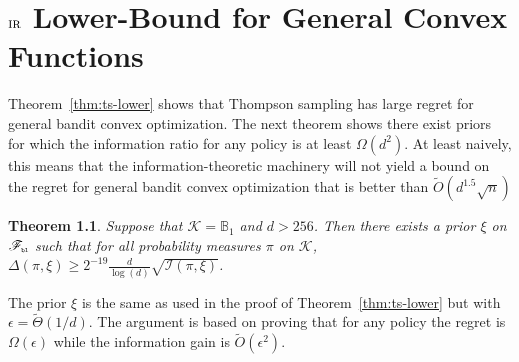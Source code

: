 \documentclass[letter, 12pt]{report}
\newcommand{\todoa}[2][]{\todo[size=\scriptsize,color=green!20!white,#1]{Alr: #2}}
\newcommand{\pb}{\text{\tiny\texttt{b}}}
\newcommand{\pl}{\text{\tiny\texttt{l}}}
\newcommand{\ball}{\mathbb{B}}
\newcommand{\cK}{\mathcal K}
\newcommand{\sF}{\mathscr F}
\newcommand{\I}{\mathcal{I}}
\newcommand{\1}{\mathbf{1}}
\newcommand{\IR}{\operatorname{\textsc{ir}}}
\theoremstyle{plain}
\newtheorem{theorem}{Theorem}
\theoremstyle{definition}
\theoremstyle{remark}
\begin{document}
\chapter{$\IR$ Lower-‌‌Bound for General Convex Functions}
Theorem~\ref{thm:ts-lower} shows that Thompson sampling has large regret for general bandit convex optimization.
The next theorem shows there exist priors for which the information ratio for any policy is at least $\Omega(d^2)$.
At least naively, this means that the information-theoretic machinery will not yield a bound on the regret for general bandit convex optimization that
is better than $\tilde O(d^{1.5} \sqrt{n})$

\begin{theorem}\label{thm:inf-lower}
    Suppose that $\cK = \ball_1$ and $d>256$. Then there exists a prior $\xi$ on $\sF_{\pb\pl}$ such that for all probability measures $\pi$ on $\cK$,
    $\Delta(\pi, \xi) \geq 2^{-19} \frac{d}{\log(d)} \sqrt{\I(\pi, \xi)}$. %
\end{theorem}

The prior $\xi$ is the same as used in the proof of Theorem~\ref{thm:ts-lower} but with $\epsilon = \tilde \Theta(1/d)$.
The argument is based on proving that for any policy the regret is $\Omega(\epsilon)$ while the information gain is $\tilde O(\epsilon^2)$.
\end{document}
